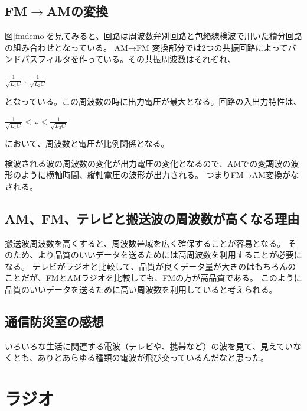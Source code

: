 \documentclass[11pt,a4j]{jsarticle}
\begin{document}
\subsection{FM$\rightarrow$AMの変換}
図\ref{fmdemo}を見てみると、回路は周波数弁別回路と包絡線検波で用いた積分回路の組み合わせとなっている。
AM→FM 変換部分では2つの共振回路によってバンドパスフィルタを作っている。その共振周波数はそれぞれ、

$\frac{1}{\sqrt{L_1C}} \, , \, \frac{1}{\sqrt{L_2C}}$

となっている。この周波数の時に出力電圧が最大となる。回路の入出力特性は、

$\frac{1}{\sqrt{L_1C}} < \omega < \frac{1}{\sqrt{L_2C}}$

において、周波数と電圧が比例関係となる。

検波される波の周波数の変化が出力電圧の変化となるので、AMでの変調波の波形のように横軸時間、縦軸電圧の波形が出力される。
つまりFM→AM変換がなされる。

\subsection{AM、FM、テレビと搬送波の周波数が高くなる理由}
搬送波周波数を高くすると、周波数帯域を広く確保することが容易となる。
そのため、より品質のいいデータを送るためには高周波数を利用することが必要になる。
テレビがラジオと比較して、品質が良くデータ量が大きのはもちろんのことだが、FMとAMラジオを比較しても、FMの方が高品質である。
このように品質のいいデータを送るために高い周波数を利用していると考えられる。

\subsection{通信防災室の感想}
いろいろな生活に関連する電波（テレビや、携帯など）の波を見て、見えていなくとも、ありとあらゆる種類の電波が飛び交っているんだなと思った。




\section{ラジオ}
\end{document}
